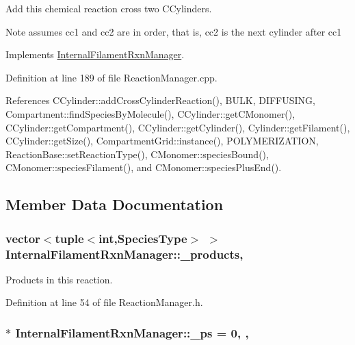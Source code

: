 Add this chemical reaction cross two C\+Cylinders. 

\begin{DoxyNote}{Note}
assumes cc1 and cc2 are in order, that is, cc2 is the next cylinder after cc1 
\end{DoxyNote}


Implements \hyperlink{classInternalFilamentRxnManager_ac8152bcd9f6aa5d69f85a98cff86d2b0}{Internal\+Filament\+Rxn\+Manager}.



Definition at line 189 of file Reaction\+Manager.\+cpp.



References C\+Cylinder\+::add\+Cross\+Cylinder\+Reaction(), B\+U\+L\+K, D\+I\+F\+F\+U\+S\+I\+N\+G, Compartment\+::find\+Species\+By\+Molecule(), C\+Cylinder\+::get\+C\+Monomer(), C\+Cylinder\+::get\+Compartment(), C\+Cylinder\+::get\+Cylinder(), Cylinder\+::get\+Filament(), C\+Cylinder\+::get\+Size(), Compartment\+Grid\+::instance(), P\+O\+L\+Y\+M\+E\+R\+I\+Z\+A\+T\+I\+O\+N, Reaction\+Base\+::set\+Reaction\+Type(), C\+Monomer\+::species\+Bound(), C\+Monomer\+::species\+Filament(), and C\+Monomer\+::species\+Plus\+End().



\subsection{Member Data Documentation}
\hypertarget{classInternalFilamentRxnManager_afd213da1a3706e2e88962e5da886a5dc}{
\subsubsection[{\+\_\+products}]{\setlength{\rightskip}{0pt plus 5cm}vector$<$tuple$<$int,{\bf Species\+Type}$>$ $>$ Internal\+Filament\+Rxn\+Manager\+::\+\_\+products\hspace{0.3cm}{\ttfamily [protected]}, {\ttfamily [inherited]}}}\label{classInternalFilamentRxnManager_afd213da1a3706e2e88962e5da886a5dc}


Products in this reaction. 



Definition at line 54 of file Reaction\+Manager.\+h.

\hypertarget{classInternalFilamentRxnManager_a973ce9cc2aae811e6867afa46193c5f2}{
\subsubsection[{\+\_\+ps}]{ $\ast$ Internal\+Filament\+Rxn\+Manager\+::\+\_\+ps = 0\hspace{0.3cm}{\ttfamily [static]}, {\ttfamily [protected]}, {\ttfamily [inherited]}}}\label{classInternalFilamentRxnManager_a973ce9cc2aae811e6867afa46193c5f2}


